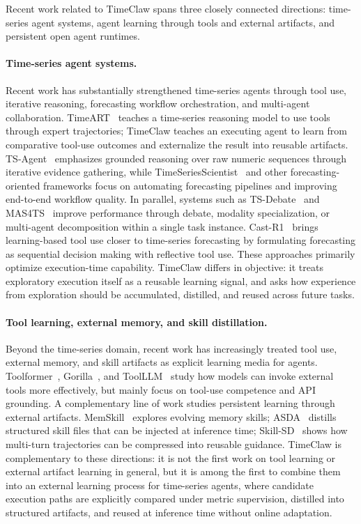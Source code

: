 Recent work related to TimeClaw spans three closely connected directions: time-series agent systems, agent learning through tools and external artifacts, and persistent open agent runtimes.

\paragraph{Time-series agent systems.}
Recent work has substantially strengthened time-series agents through tool use, iterative reasoning, forecasting workflow orchestration, and multi-agent collaboration. TimeART~\cite{timeart} teaches a time-series reasoning model to use tools through expert trajectories; TimeClaw teaches an executing agent to learn from comparative tool-use outcomes and externalize the result into reusable artifacts. TS-Agent~\cite{tsagent} emphasizes grounded reasoning over raw numeric sequences through iterative evidence gathering, while TimeSeriesScientist~\cite{tssci} and other forecasting-oriented frameworks focus on automating forecasting pipelines and improving end-to-end workflow quality. In parallel, systems such as TS-Debate~\cite{tsdebate} and MAS4TS~\cite{mas4ts} improve performance through debate, modality specialization, or multi-agent decomposition within a single task instance. Cast-R1~\cite{castr1} brings learning-based tool use closer to time-series forecasting by formulating forecasting as sequential decision making with reflective tool use. These approaches primarily optimize execution-time capability. TimeClaw differs in objective: it treats exploratory execution itself as a reusable learning signal, and asks how experience from exploration should be accumulated, distilled, and reused across future tasks.

\paragraph{Tool learning, external memory, and skill distillation.}
Beyond the time-series domain, recent work has increasingly treated tool use, external memory, and skill artifacts as explicit learning media for agents. Toolformer~\cite{toolformer}, Gorilla~\cite{gorilla}, and ToolLLM~\cite{toolllm} study how models can invoke external tools more effectively, but mainly focus on tool-use competence and API grounding. A complementary line of work studies persistent learning through external artifacts. MemSkill~\cite{memskill} explores evolving memory skills; ASDA~\cite{asda} distills structured skill files that can be injected at inference time; Skill-SD~\cite{skillsd} shows how multi-turn trajectories can be compressed into reusable guidance. TimeClaw is complementary to these directions: it is not the first work on tool learning or external artifact learning in general, but it is among the first to combine them into an external learning process for time-series agents, where candidate execution paths are explicitly compared under metric supervision, distilled into structured artifacts, and reused at inference time without online adaptation.

